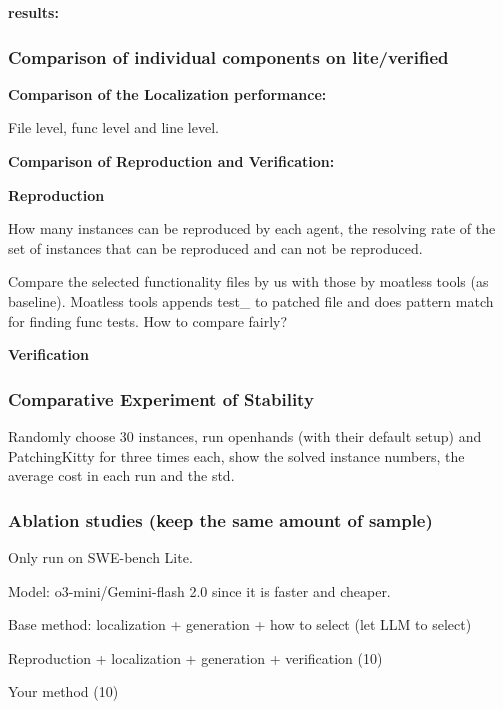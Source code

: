 \textbf{results:} 

\subsubsection{Comparison of individual components on lite/verified}



\textbf{Comparison of the Localization performance:} 

File level, func level and line level.


\textbf{Comparison of Reproduction and Verification:} 

\textbf{Reproduction}

How many instances can be reproduced by each agent, the resolving rate of the set of instances that can be reproduced and can not be reproduced.

Compare the selected functionality files by us with those by moatless tools (as baseline). 
Moatless tools appends test\_ to patched file and does pattern match for finding func tests.
How to compare fairly?

\textbf{Verification}



\subsubsection{Comparative Experiment of Stability}

Randomly choose 30 instances, run openhands (with their default setup) and PatchingKitty for three times each, show the solved instance numbers, the average cost in each run and the std.


\subsubsection{Ablation studies (keep the same amount of sample)}

Only run on SWE-bench Lite.

Model: o3-mini/Gemini-flash 2.0 since it is faster and cheaper.

Base method: localization + generation + how to select (let LLM to select)

Reproduction + localization + generation + verification (10)

Your method (10)




